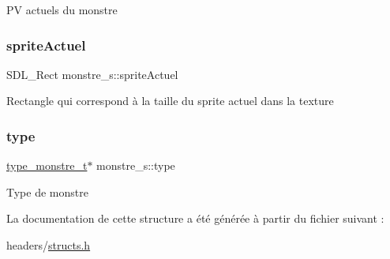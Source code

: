 PV actuels du monstre \mbox{\label{structmonstre__s_a7c57e6c890e0709f09b1df09c71a8daa}} 
\subsubsection{\texorpdfstring{sprite\+Actuel}{spriteActuel}}
{\footnotesize\ttfamily S\+D\+L\+\_\+\+Rect monstre\+\_\+s\+::sprite\+Actuel}

Rectangle qui correspond à la taille du sprite actuel dans la texture \mbox{\label{structmonstre__s_af58fb0da12d89fbdce602578f457560e}} 
\subsubsection{\texorpdfstring{type}{type}}
{\footnotesize\ttfamily \hyperlink{structtype__monstre__s}{type\+\_\+monstre\+\_\+t}$\ast$ monstre\+\_\+s\+::type}

Type de monstre 

La documentation de cette structure a été générée à partir du fichier suivant \+:\begin{DoxyCompactItemize}
\item 
headers/\hyperlink{structs_8h}{structs.\+h}\end{DoxyCompactItemize}
